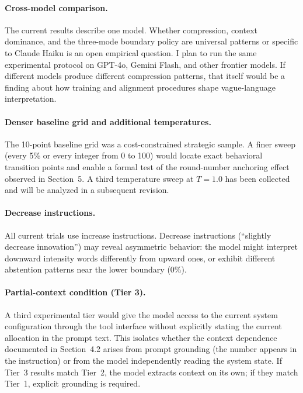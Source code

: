 \documentclass[11pt]{article}
\begin{document}
\paragraph{Cross-model comparison.}
The current results describe one model. Whether compression, context dominance, and the three-mode boundary policy are universal patterns or specific to Claude Haiku is an open empirical question. I plan to run the same experimental protocol on GPT-4o, Gemini Flash, and other frontier models. If different models produce different compression patterns, that itself would be a finding about how training and alignment procedures shape vague-language interpretation.

\paragraph{Denser baseline grid and additional temperatures.}
The 10-point baseline grid was a cost-constrained strategic sample. A finer sweep (every 5\% or every integer from 0 to 100) would locate exact behavioral transition points and enable a formal test of the round-number anchoring effect observed in Section~5. A third temperature sweep at $T{=}1.0$ has been collected and will be analyzed in a subsequent revision.

\paragraph{Decrease instructions.}
All current trials use increase instructions. Decrease instructions (``slightly decrease innovation'') may reveal asymmetric behavior: the model might interpret downward intensity words differently from upward ones, or exhibit different abstention patterns near the lower boundary (0\%).

\paragraph{Partial-context condition (Tier 3).}
A third experimental tier would give the model access to the current system configuration through the tool interface without explicitly stating the current allocation in the prompt text. This isolates whether the context dependence documented in Section~4.2 arises from prompt grounding (the number appears in the instruction) or from the model independently reading the system state. If Tier~3 results match Tier~2, the model extracts context on its own; if they match Tier~1, explicit grounding is required.
\end{document}
